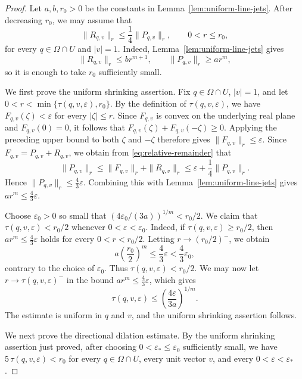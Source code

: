 \documentclass[11pt]{article}
\theoremstyle{definition}
\newcommand{\eps}{\varepsilon}
\begin{document}
\begin{proof}
	Let \(a,b,r_0>0\) be the constants in
	Lemma~\ref{lem:uniform-line-jets}.  After decreasing \(r_0\), we may
	assume that
	\begin{equation}\label{eq:relative-remainder}
		\|R_{q,v}\|_r
		\le
		\frac14\|P_{q,v}\|_r,
		\qquad 0<r\le r_0,
	\end{equation}
	for every \(q\in\Omega\cap U\) and \(|v|=1\).  Indeed,
	Lemma~\ref{lem:uniform-line-jets} gives
	\[
	\|R_{q,v}\|_r\le br^{m+1},
	\qquad
	\|P_{q,v}\|_r\ge ar^m,
	\]
	so it is enough to take \(r_0\) sufficiently small.
	
	We first prove the uniform shrinking assertion.  Fix
	\(q\in\Omega\cap U\), \(|v|=1\), and let
	\(0<r<\min\{\tau(q,v,\eps),r_0\}\).
	By the definition of \(\tau(q,v,\varepsilon)\), we have
	\(F_{q,v}(\zeta)<\varepsilon\) for every \(|\zeta|\le r\).
	Since \(F_{q,v}\) is convex on the underlying real plane and
	\(F_{q,v}(0)=0\), it follows that
	\(F_{q,v}(\zeta)+F_{q,v}(-\zeta)\ge0\).
	Applying the preceding upper bound to both \(\zeta\) and \(-\zeta\)
	therefore gives \(\|F_{q,v}\|_r\le\eps\).
	Since
	\(
	F_{q,v}=P_{q,v}+R_{q,v}
	\),
	we obtain from \eqref{eq:relative-remainder} that
	\[
	\|P_{q,v}\|_r
	\le
	\|F_{q,v}\|_r+\|R_{q,v}\|_r
	\le
	\eps+\frac14\|P_{q,v}\|_r.
	\]
	Hence \(\|P_{q,v}\|_r\le\frac43\eps\).
	Combining this with Lemma~\ref{lem:uniform-line-jets} gives
	\(ar^m\le\frac43\eps\).
	
	Choose \(\eps_0>0\) so small that
	\((4\eps_0/(3a))^{1/m}<r_0/2\).
	We claim that \(\tau(q,v,\eps)<r_0/2\) whenever \(0<\eps<\eps_0\).
	Indeed, if \(\tau(q,v,\eps)\ge r_0/2\), then
	\(ar^m\le\frac43\eps\) holds for every \(0<r<r_0/2\).
	Letting \(r\to(r_0/2)^-\), we obtain
	\[
	a\left(\frac{r_0}{2}\right)^m
	\le
	\frac43\eps
	<
	\frac43\eps_0,
	\]
	contrary to the choice of \(\eps_0\).  Thus
	\(\tau(q,v,\eps)<r_0/2\).  We may now let
	\(r\to\tau(q,v,\eps)^-\) in the bound \(ar^m\le\frac43\eps\), which gives
	\[
	\tau(q,v,\eps)
	\le
	\left(\frac{4\eps}{3a}\right)^{1/m}.
	\]
	The estimate is uniform in \(q\) and \(v\), and the uniform shrinking
	assertion follows.
	
	We next prove the directional dilation estimate.  By the uniform shrinking
	assertion just proved, after choosing
	\(0<\eps_*\le\eps_0\) sufficiently small, we have
	\(5\,\tau(q,v,\eps)<r_0\) for every \(q\in\Omega\cap U\),
	every unit vector \(v\), and every \(0<\eps<\eps_*\).
	

\end{proof}
\end{document}
